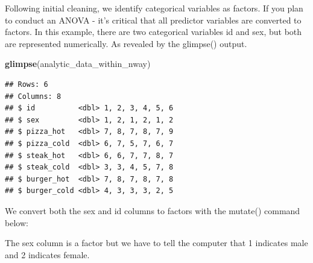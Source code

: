 \documentclass[
]{krantz}
\makeatletter
\newenvironment{Shaded}{\begin{snugshade}}{\end{snugshade}}
\newcommand{\DataTypeTok}[1]{\textcolor[rgb]{0.27,0.27,0.27}{#1}}
\newcommand{\KeywordTok}[1]{\textcolor[rgb]{0.27,0.27,0.27}{\textbf{#1}}}
\newcommand{\NormalTok}[1]{#1}
\newcommand{\OperatorTok}[1]{\textcolor[rgb]{0.43,0.43,0.43}{\textbf{#1}}}
\newcommand{\StringTok}[1]{\textcolor[rgb]{0.5,0.5,0.5}{#1}}
\newenvironment{kframe}{%
\medskip{}
\setlength{\fboxsep}{.8em}
 \def\at@end@of@kframe{}%
 \ifinner\ifhmode%
  \def\at@end@of@kframe{\end{minipage}}%
  \begin{minipage}{\columnwidth}%
 \fi\fi%
 \def\FrameCommand##1{\hskip\@totalleftmargin \hskip-\fboxsep
 \colorbox{shadecolor}{##1}\hskip-\fboxsep
     \hskip-\linewidth \hskip-\@totalleftmargin \hskip\columnwidth}%
 \MakeFramed {\advance\hsize-\width
   \@totalleftmargin\z@ \linewidth\hsize
   \@setminipage}}%
 {\par\unskip\endMakeFramed%
 \at@end@of@kframe}
\renewenvironment{Shaded}{\begin{kframe}}{\end{kframe}}
\makeatother
\begin{document}
Following initial cleaning, we identify categorical variables as factors. If you plan to conduct an ANOVA - it's critical that all predictor variables are converted to factors. In this example, there are two categorical variables id and sex, but both are represented numerically. As revealed by the glimpse() output.

\begin{Shaded}
\begin{Highlighting}[]
\KeywordTok{glimpse}\NormalTok{(analytic_data_within_nway)}
\end{Highlighting}
\end{Shaded}

\begin{verbatim}
## Rows: 6
## Columns: 8
## $ id          <dbl> 1, 2, 3, 4, 5, 6
## $ sex         <dbl> 1, 2, 1, 2, 1, 2
## $ pizza_hot   <dbl> 7, 8, 7, 8, 7, 9
## $ pizza_cold  <dbl> 6, 7, 5, 7, 6, 7
## $ steak_hot   <dbl> 6, 6, 7, 7, 8, 7
## $ steak_cold  <dbl> 3, 3, 4, 5, 7, 8
## $ burger_hot  <dbl> 7, 8, 7, 8, 7, 8
## $ burger_cold <dbl> 4, 3, 3, 3, 2, 5
\end{verbatim}

We convert both the sex and id columns to factors with the mutate() command below:

\begin{Shaded}
\end{Shaded}

The sex column is a factor but we have to tell the computer that 1 indicates male and 2 indicates female.

\begin{Shaded}
\end{Shaded}
\end{document}
